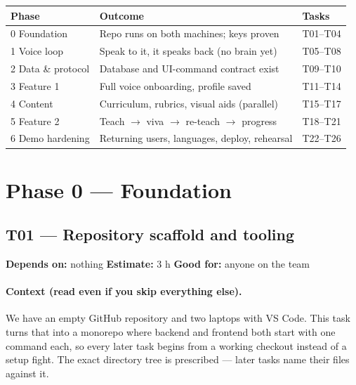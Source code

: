 \documentclass[11pt]{article}
\newcommand{\taskmeta}[3]{\noindent\textbf{Depends on:} #1 \quad\textbullet\quad \textbf{Estimate:} #2 \quad\textbullet\quad \textbf{Good for:} #3\par\vspace{2pt}}
\newcommand{\ctx}[1]{\paragraph{Context (read even if you skip everything else).} #1}
\begin{document}
\begin{center}
\begin{tabular}{p{2.6cm} p{7.6cm} p{2.8cm}}
\toprule
\textbf{Phase} & \textbf{Outcome} & \textbf{Tasks} \\
\midrule
0 Foundation & Repo runs on both machines; keys proven & T01--T04 \\
1 Voice loop & Speak to it, it speaks back (no brain yet) & T05--T08 \\
2 Data \& protocol & Database and UI-command contract exist & T09--T10 \\
3 Feature 1 & Full voice onboarding, profile saved & T11--T14 \\
4 Content & Curriculum, rubrics, visual aids (parallel) & T15--T17 \\
5 Feature 2 & Teach $\rightarrow$ viva $\rightarrow$ re-teach $\rightarrow$ progress & T18--T21 \\
6 Demo hardening & Returning users, languages, deploy, rehearsal & T22--T26 \\
\bottomrule
\end{tabular}
\end{center}

\section{Phase 0 --- Foundation}

\subsection{T01 --- Repository scaffold and tooling}
\taskmeta{nothing}{3 h}{anyone on the team}
\ctx{We have an empty GitHub repository and two laptops with VS Code. This task turns that into a monorepo where backend and frontend both start with one command each, so every later task begins from a working checkout instead of a setup fight. The exact directory tree is prescribed --- later tasks name their files against it.}
\end{document}

